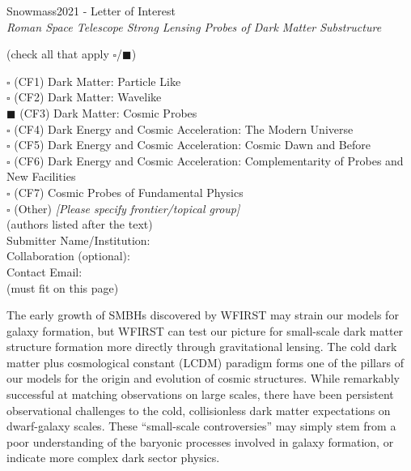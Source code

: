 \documentclass[11pt]{article}
\begin{document}
\begin{raggedright} 
\huge
Snowmass2021 - Letter of Interest \hfill \\[+1em]
\textit{Roman Space Telescope Strong Lensing Probes of Dark Matter Substructure} \hfill \\[+1em]
\end{raggedright}

\normalsize

  (check all that apply $\square$/$\blacksquare$)

\noindent $\square$ (CF1) Dark Matter: Particle Like \\
\noindent $\square$ (CF2) Dark Matter: Wavelike  \\ 
\noindent $\blacksquare$ (CF3) Dark Matter: Cosmic Probes  \\
\noindent $\square$ (CF4) Dark Energy and Cosmic Acceleration: The Modern Universe \\
\noindent $\square$ (CF5) Dark Energy and Cosmic Acceleration: Cosmic Dawn and Before \\
\noindent $\square$ (CF6) Dark Energy and Cosmic Acceleration: Complementarity of Probes and New Facilities \\
\noindent $\square$ (CF7) Cosmic Probes of Fundamental Physics \\
\noindent $\square$ (Other) {\it [Please specify frontier/topical group]} \\

 (authors listed after the text)\\
Submitter Name/Institution: \\
Collaboration (optional): \\
Contact Email: \\

 (must fit on this page)

\clearpage



The early growth of SMBHs discovered by WFIRST may strain our models for galaxy
formation, but WFIRST can test our picture for small-scale dark matter structure formation more
directly through gravitational lensing. The cold dark matter plus cosmological constant (LCDM)
paradigm forms one of the pillars of our models for the origin and evolution of cosmic structures.
While remarkably successful at matching observations on large scales, there have been persistent
observational challenges to the cold, collisionless dark matter expectations on dwarf-galaxy
scales. These “small-scale controversies” may simply stem from a poor understanding of the
baryonic processes involved in galaxy formation, or indicate more complex dark sector physics.
\end{document}
